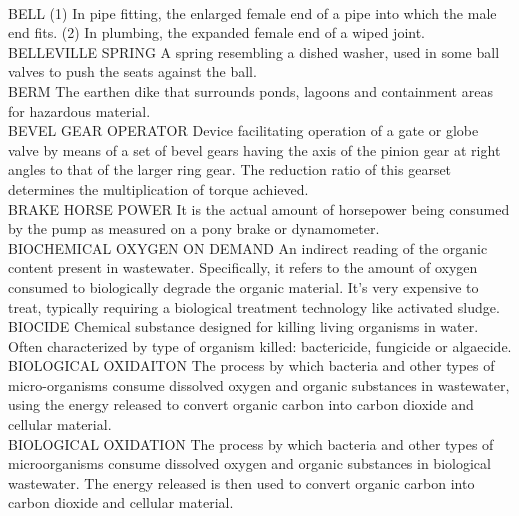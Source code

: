\vspace{0.3cm}\\
BELL
(1) In pipe fitting, the enlarged female end of a pipe into which the male end fits. (2) In plumbing, the expanded female end of a wiped joint. 
\vspace{0.3cm}\\
BELLEVILLE SPRING
A spring resembling a dished washer, used in some ball valves to push the seats against the ball.
\vspace{0.3cm}\\
BERM
The earthen dike that surrounds ponds, lagoons and containment areas for hazardous material.
\vspace{0.3cm}\\
BEVEL GEAR OPERATOR
Device facilitating operation of a gate or globe valve by means of a set of bevel gears having the axis of the pinion gear at right angles to that of the larger ring gear. The reduction ratio of this gearset determines the multiplication of torque achieved.
\vspace{0.3cm}\\
BRAKE HORSE POWER
It is the actual amount of horsepower being consumed by the pump as measured on a pony brake or dynamometer.
\vspace{0.3cm}\\
BIOCHEMICAL OXYGEN ON DEMAND
An indirect reading of the organic content present in wastewater. Specifically, it refers to the amount of oxygen consumed to biologically degrade the organic material. It’s very expensive to treat, typically requiring a biological treatment technology like activated sludge.
\vspace{0.3cm}\\
BIOCIDE
Chemical substance designed for killing living organisms in water. Often characterized by type of organism killed: bactericide, fungicide or algaecide.
\vspace{0.3cm}\\
BIOLOGICAL OXIDAITON
The process by which bacteria and other types of micro-organisms consume dissolved oxygen and organic substances in wastewater, using the energy released to convert organic carbon into carbon dioxide and cellular material.
\vspace{0.3cm}\\
BIOLOGICAL OXIDATION
The process by which bacteria and other types of microorganisms consume dissolved oxygen and organic substances in biological wastewater.  The energy released is then used to convert organic carbon into carbon dioxide and cellular material. 

